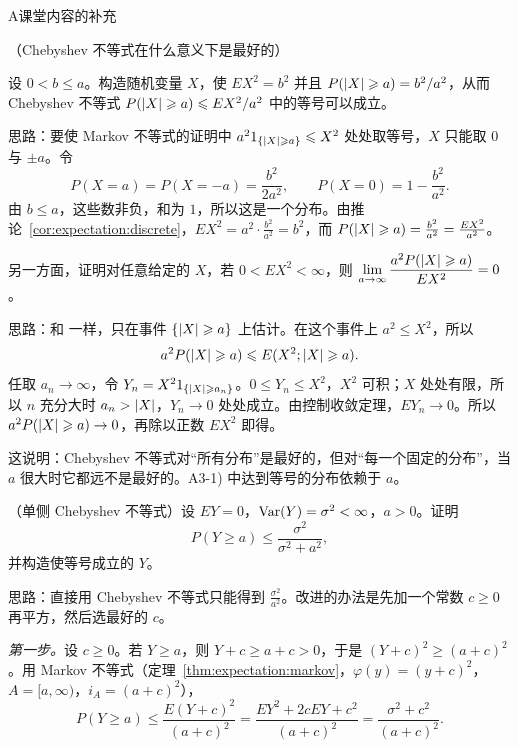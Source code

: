\begin{exercises}{A}{课堂内容的补充}
\item\label{ex:expectation:A3} （Chebyshev 不等式在什么意义下是最好的）
\begin{questions}
\item 设 $0<b\leqslant a$。构造随机变量 $X$，使 $EX^2=b^2$ 并且 $P(\lvert X\rvert\geqslant a)=b^2/a^2$，从而 Chebyshev 不等式 $P(\lvert X\rvert\geqslant a)\leqslant EX^2/a^2$ 中的等号可以成立。
\begin{solution}
思路：要使 Markov 不等式的证明中 $a^21_{\{\lvert X\rvert\geqslant a\}}\leqslant X^2$ 处处取等号，$X$ 只能取 $0$ 与 $\pm a$。令
\[
P(X=a)=P(X=-a)=\frac{b^2}{2a^2},\qquad P(X=0)=1-\frac{b^2}{a^2}.
\]
由 $b\leqslant a$，这些数非负，和为 $1$，所以这是一个分布。由推论~\ref{cor:expectation:discrete}，$EX^2=a^2\cdot\frac{b^2}{a^2}=b^2$，而 $P(\lvert X\rvert\geqslant a)=\frac{b^2}{a^2}=\frac{EX^2}{a^2}$。
\end{solution}
\item 另一方面，证明对任意给定的 $X$，若 $0<EX^2<\infty$，则 $\displaystyle\lim_{a\to\infty}\frac{a^2P(\lvert X\rvert\geqslant a)}{EX^2}=0$。
\begin{solution}
思路：和 一样，只在事件 $\{\lvert X\rvert\geqslant a\}$ 上估计。在这个事件上 $a^2\leqslant X^2$，所以
\[
a^2P(\lvert X\rvert\geqslant a)\leqslant E(X^2;\lvert X\rvert\geqslant a).
\]
任取 $a_n\to\infty$，令 $Y_n=X^21_{\{\lvert X\rvert\geqslant a_n\}}$。$0\leqslant Y_n\leqslant X^2$，$X^2$ 可积；$X$ 处处有限，所以 $n$ 充分大时 $a_n>\lvert X\rvert$，$Y_n\to0$ 处处成立。由控制收敛定理，$EY_n\to0$。所以 $a^2P(\lvert X\rvert\geqslant a)\to0$，再除以正数 $EX^2$ 即得。

这说明：Chebyshev 不等式对“所有分布”是最好的，但对“每一个固定的分布”，当 $a$ 很大时它都远不是最好的。A3-1) 中达到等号的分布依赖于 $a$。
\end{solution}
\end{questions}

\item\label{ex:expectation:A4} （单侧 Chebyshev 不等式）设 $EY=0$，$\operatorname{Var}(Y)=\sigma^2<\infty$，$a>0$。证明
\[
P(Y\geqslant a)\leqslant\frac{\sigma^2}{\sigma^2+a^2},
\]
并构造使等号成立的 $Y$。
\begin{solution}
思路：直接用 Chebyshev 不等式只能得到 $\frac{\sigma^2}{a^2}$。改进的办法是先加一个常数 $c\geqslant0$ 再平方，然后选最好的 $c$。

\emph{第一步。}设 $c\geqslant0$。若 $Y\geqslant a$，则 $Y+c\geqslant a+c>0$，于是 $(Y+c)^2\geqslant(a+c)^2$。用 Markov 不等式（定理~\ref{thm:expectation:markov}，$\varphi(y)=(y+c)^2$，$A=[a,\infty)$，$i_A=(a+c)^2$），
\[
P(Y\geqslant a)\leqslant\frac{E(Y+c)^2}{(a+c)^2}=\frac{EY^2+2cEY+c^2}{(a+c)^2}=\frac{\sigma^2+c^2}{(a+c)^2}.
\]


\end{solution}
\end{exercises}
